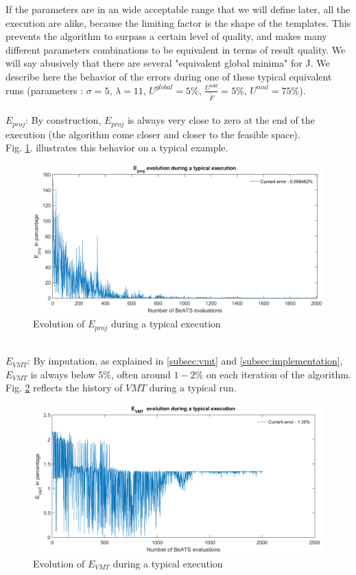 If the parameters are in an wide acceptable range that we will define later, all the execution are alike, because the limiting factor is the shape of the templates. This prevents the algorithm to surpass a certain level of quality, and makes many different parameters combinations to be equivalent in terms of result quality.
We will say abusively that there are several "equivalent global minima" for J.
We describe here the behavior of the errors during one of these typical equivalent runs (parameters : $\sigma=5$, $\lambda=11$, $U^{global}=5\% $, $\frac{U^{add}}{\widetilde{F}}=5\% $, $U^{mul}=75 \% $).\\
\\
\emph{$E_{proj}$}: By construction, $E_{proj}$ is always very close to zero at the end of the execution (the algorithm come closer and closer to the feasible space).\\
Fig. \ref{fig:eprojexample}. illustrates this behavior on a typical example.\\ 
\begin{figure}[h]
	\label{fig:eprojexample}
	\caption{Evolution of $E_{proj}$ during a typical execution}
	\includegraphics[width=7in]{figures/results_figures/eprojexample.png}
\end{figure}	
\\
\emph{$E_{VMT}$}: By imputation, as explained in \ref{subsec:vmt} and \ref{subsec:implementation}, $E_{VMT}$ is always below $5\%$, often around $1-2\%$ on each iteration of the algorithm.\\
Fig. \ref{fig:vmtexample} reflects the history of $VMT$ during a typical run.\\
\begin{figure}[h]
	\label{fig:vmtexample}
	\caption{Evolution of $E_{VMT}$ during a typical execution}
	\includegraphics[width=7in]{figures/results_figures/VMTexample.png}
\end{figure}	
